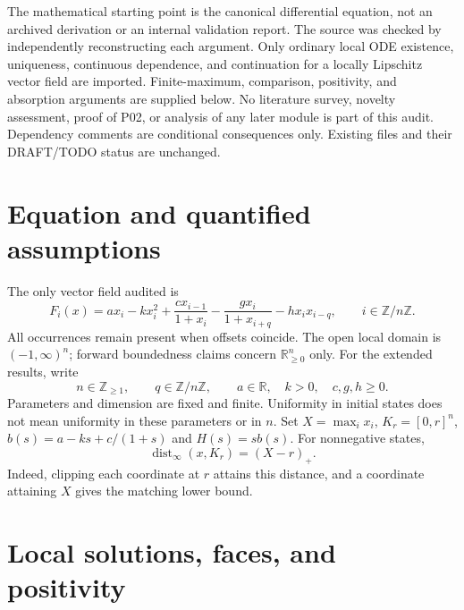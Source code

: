 \documentclass[11pt]{article}
\newcommand{\RR}{\mathbb R}
\newcommand{\ZZ}{\mathbb Z}
\newcommand{\Orth}{\RR_{\geq0}^{n}}
\newcommand{\Dom}{(-1,\infty)^n}
\newcommand{\dist}{\operatorname{dist}_{\infty}}
\newcommand{\pos}[1]{(#1)_+}
\begin{document}
The mathematical starting point is the canonical differential equation,
not an archived derivation or an internal validation report. The source
was checked by independently reconstructing each argument. Only ordinary
local ODE existence, uniqueness, continuous dependence, and continuation
for a locally Lipschitz vector field are imported. Finite-maximum,
comparison, positivity, and absorption arguments are supplied below.
No literature survey, novelty assessment, proof of P02, or analysis of
any later module is part of this audit. Dependency comments are conditional
consequences only. Existing files and their DRAFT/TODO status are unchanged.

\section{Equation and quantified assumptions}
The only vector field audited is
\begin{equation}\label{A01:field}
 F_i(x)=a x_i-kx_i^2+\frac{c x_{i-1}}{1+x_i}
       -\frac{g x_i}{1+x_{i+q}}-h x_i x_{i-q},
 \qquad i\in\ZZ/n\ZZ.
\end{equation}
All occurrences remain present when offsets coincide. The open local
domain is $\Dom$; forward boundedness claims concern $\Orth$ only.
For the extended results, write
\begin{equation}\label{A01:weak}
 n\in\ZZ_{\geq1},\qquad q\in\ZZ/n\ZZ,\qquad
 a\in\RR,\quad k>0,\quad c,g,h\geq0.
\end{equation}
Parameters and dimension are fixed and finite. Uniformity in initial
states does not mean uniformity in these parameters or in $n$.
Set $X=\max_i x_i$, $K_r=[0,r]^n$, $b(s)=a-ks+c/(1+s)$ and
$H(s)=s b(s)$. For nonnegative states,
\begin{equation}\label{A01:distance}
 \dist(x,K_r)=\pos{X-r}.
\end{equation}
Indeed, clipping each coordinate at $r$ attains this distance, and a
coordinate attaining $X$ gives the matching lower bound.

\section{Local solutions, faces, and positivity}
\end{document}
